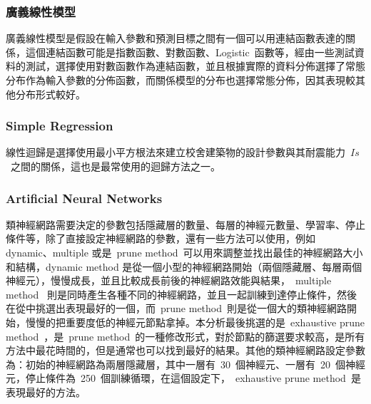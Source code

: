 \subsubsection{廣義線性模型}

廣義線性模型是假設在輸入參數和預測目標之間有一個可以用連結函數表達的關係，這個連結函數可能是指數函數、對數函數、Logistic~函數等，經由一些測試資料的測試，選擇使用對數函數作為連結函數，並且根據實際的資料分佈選擇了常態分布作為輸入參數的分佈函數，而關係模型的分布也選擇常態分佈，因其表現較其他分布形式較好。


\subsubsection{Simple Regression}

線性迴歸是選擇使用最小平方根法來建立校舍建築物的設計參數與其耐震能力~$Is$~之間的關係，這也是最常使用的迴歸方法之一。


\subsubsection{Artificial Neural Networks}

類神經網路需要決定的參數包括隱藏層的數量、每層的神經元數量、學習率、停止條件等，除了直接設定神經網路的參數，還有一些方法可以使用，例如 dynamic、multiple 或是~prune method~可以用來調整並找出最佳的神經網路大小和結構，dynamic method 是從一個小型的神經網路開始（兩個隱藏層、每層兩個神經元），慢慢成長，並且比較成長前後的神經網路效能與結果，~multiple method~ 則是同時產生各種不同的神經網路，並且一起訓練到達停止條件，然後在從中挑選出表現最好的一個，而~prune method~則是從一個大的類神經網路開始，慢慢的把重要度低的神經元節點拿掉。本分析最後挑選的是~exhaustive prune method~，是~prune method~的一種修改形式，對於節點的篩選要求較高，是所有方法中最花時間的，但是通常也可以找到最好的結果。其他的類神經網路設定參數為：初始的神經網路為兩層隱藏層，其中一層有~30~個神經元、一層有~20~個神經元，停止條件為~250~個訓練循環，在這個設定下，~exhaustive prune method~是表現最好的方法。

